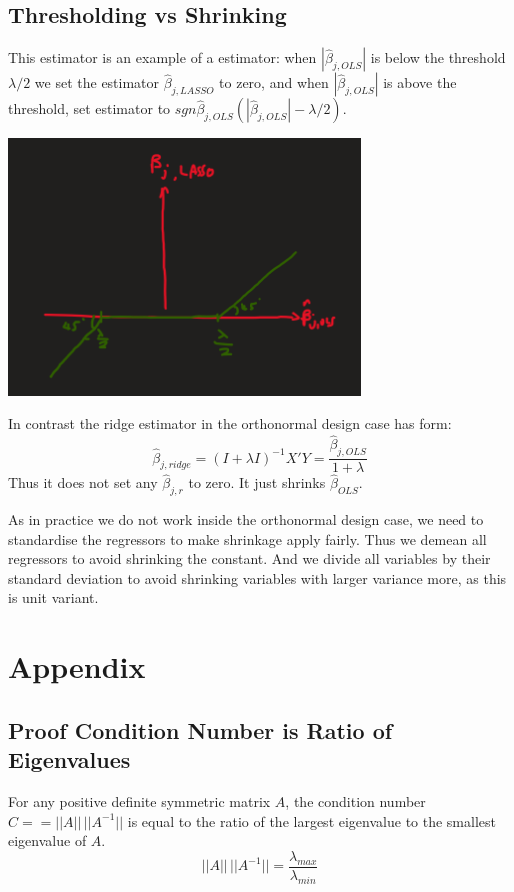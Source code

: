 \documentclass[DIV=14,titlepage=false]{scrreprt}
\begin{document}
\subsection{Thresholding vs Shrinking}
This estimator is an example of a \underline{} estimator: when \(|\hat{\beta}_{j,OLS}|\) is below the threshold \(\lambda/2\) we set the estimator \(\hat{\beta}_{j,LASSO}\) to zero, and when \(|\hat{\beta}_{j,OLS}|\) is above the threshold, set estimator to \(sgn{\hat{\beta}_{j,OLS}}(|\hat{\beta}_{j,OLS}|-\lambda/2)\).
\begin{center}
\includegraphics[width=0.7\textwidth]{soft thresholding lasso.png}
\end{center}
In contrast the ridge estimator in the orthonormal design case has form:
\[\hat{\beta}_{j,ridge}=(I+\lambda I)^{-1}X'Y=\frac{\hat{\beta}_{j,OLS}}{1+\lambda}\]
Thus it does not set any \(\hat{\beta}_{j,r}\) to zero. It just shrinks \(\hat{\beta}_{OLS}\).

\begin{note}
    As in practice we do not work inside the orthonormal design case, we need to standardise the regressors to make shrinkage apply fairly.
    Thus we demean all regressors to avoid shrinking the constant.
    And we divide all variables by their standard deviation to avoid shrinking variables with larger variance more, as this is unit variant.
\end{note}
\newpage
\section{Appendix}
\subsection{Proof Condition Number is Ratio of Eigenvalues}

\begin{theorem}
    For any positive definite symmetric matrix \(A\), the condition number \(C== ||A|| \, ||A^{-1}||\) is equal to the ratio of the largest eigenvalue to the smallest eigenvalue of \(A\).
    \[||A|| \, ||A^{-1}||=\frac{\lambda_{max}}{\lambda_{min}}\]
\end{theorem}
\end{document}
